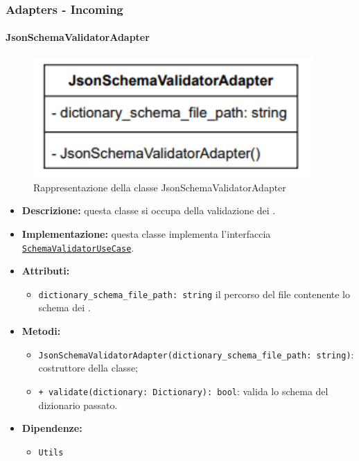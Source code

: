 \subsubsection{Adapters - Incoming}

\paragraph{JsonSchemaValidatorAdapter} \label{JsonSchemaValidatorAdapter}
\begin{figure}[H]
    \centering
    \includegraphics[width=0.95\textwidth]{assets/Backend/json_schema_validator_adapter.png}
    \caption{Rappresentazione della classe JsonSchemaValidatorAdapter}
  \end{figure}
\begin{itemize}
    \item \textbf{Descrizione:} questa classe si occupa della validazione dei .
    \item \textbf{Implementazione:} questa classe implementa l'interfaccia \hyperref[SchemaValidatorUseCase]{\texttt{SchemaValidatorUseCase}}.
    \item \textbf{Attributi:}
    \begin{itemize}
        \item \texttt{dictionary\_schema\_file\_path: string} il percorso del file contenente lo schema dei .
    \end{itemize}
    \item \textbf{Metodi:}
    \begin{itemize}
        \item \texttt{JsonSchemaValidatorAdapter(dictionary\_schema\_file\_path: string)}: costruttore della classe;
        \item \texttt{+ validate(dictionary: Dictionary): bool}: valida lo schema del dizionario passato.
    \end{itemize}
    \item \textbf{Dipendenze:}
    \begin{itemize}
        \item \texttt{Utils}
    \end{itemize}
\end{itemize} 

